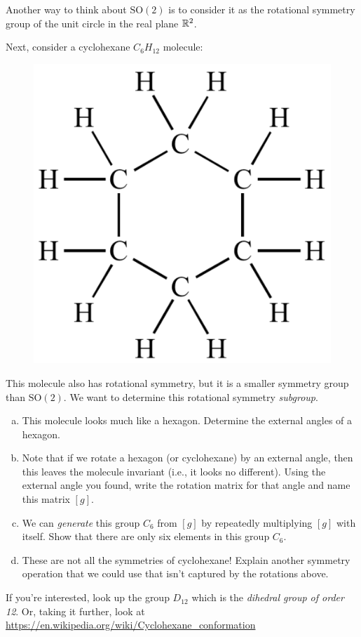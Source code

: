 \documentclass[12pt]{article} %
\begin{document}
\begin{problem}
Another way to think about $\mathrm{SO}(2)$ is to consider it as the rotational symmetry group of the unit circle in the real plane $\mathbb{R}^2$.

Next, consider a cyclohexane $C_6H_{12}$ molecule:
    \begin{figure}[H]
        \centering
        \includegraphics[width=.3\textwidth]{cyclohexane-500x500.png}
    \end{figure}
    \noindent This molecule also has rotational symmetry, but it is a smaller symmetry group than $\mathrm{SO}(2)$. We want to determine this rotational symmetry \emph{subgroup}.
\begin{enumerate}[(a)]
    \item This molecule looks much like a hexagon. Determine the external angles of a hexagon.
    \item Note that if we rotate a hexagon (or cyclohexane) by an external angle, then this leaves the molecule invariant (i.e., it looks no different). Using the external angle you found, write the rotation matrix for that angle and name this matrix $[g]$.
    \item We can \emph{generate} this group $C_6$ from $[g]$ by repeatedly multiplying $[g]$ with itself.  Show that there are only six elements in this group $C_6$.
    \item These are not all the symmetries of cyclohexane! Explain another symmetry operation that we could use that isn't captured by the rotations above.
\end{enumerate}
If you're interested, look up the group $D_{12}$ which is the \emph{dihedral group of order 12}. Or, taking it further, look at \url{https://en.wikipedia.org/wiki/Cyclohexane_conformation}
\end{problem}
\end{document}
